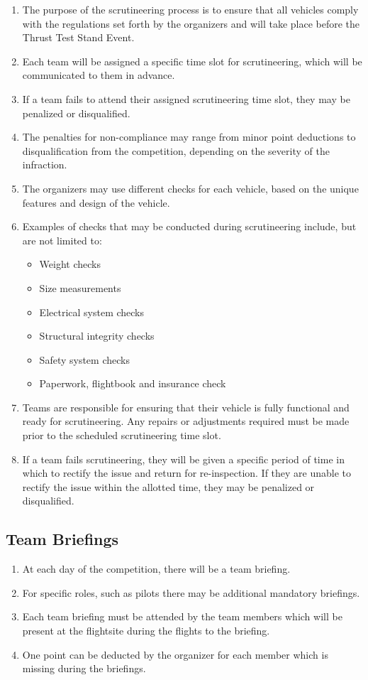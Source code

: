     \begin{enumerate}
    \item The purpose of the scrutineering process is to ensure that all vehicles comply with the regulations set forth by the organizers and will take place before the Thrust Test Stand Event.    \item Each team will be assigned a specific time slot for scrutineering, which will be communicated to them in advance.
    \item If a team fails to attend their assigned scrutineering time slot, they may be penalized or disqualified.
    \item The penalties for non-compliance may range from minor point deductions to disqualification from the competition, depending on the severity of the infraction.
    \item The organizers may use different checks for each vehicle, based on the unique features and design of the vehicle.
    \item Examples of checks that may be conducted during scrutineering include, but are not limited to:
    \begin{itemize}
    \item Weight checks
    \item Size measurements 
    \item Electrical system checks
    \item Structural integrity checks
    \item Safety system checks
    \item Paperwork, flightbook and insurance check
    \end{itemize}
    \item Teams are responsible for ensuring that their vehicle is fully functional and ready for scrutineering. Any repairs or adjustments required must be made prior to the scheduled scrutineering time slot.
    \item If a team fails scrutineering, they will be given a specific period of time in which to rectify the issue and return for re-inspection. If they are unable to rectify the issue within the allotted time, they may be penalized or disqualified.
    \end{enumerate}

    \subsection{Team Briefings}
    \begin{enumerate}
      \item At each day of the competition, there will be a team briefing.
      \item For specific roles, such as pilots there may be additional mandatory briefings.
      \item Each team briefing must be attended by the team members which will be present at the flightsite during the flights to the briefing.
      \item One point can be deducted by the organizer for each member which is missing during the briefings.
    \end{enumerate}

